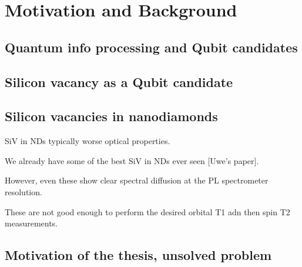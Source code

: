 
\chapter[Motivation and Background]
{Motivation and Background} %

\label{Chapter1} %


\newcommand{\keyword}[1]{\textbf{#1}}
\newcommand{\tabhead}[1]{\textbf{#1}}
\newcommand{\code}[1]{\texttt{#1}}
\newcommand{\file}[1]{\texttt{\bfseries#1}}
\newcommand{\option}[1]{\texttt{\itshape#1}}


\section[Quantum info processing and Qubit candidates]{Quantum info processing and Qubit candidates}



\section[Silicon vacancy as a Qubit candidate]{Silicon vacancy as a Qubit candidate}


\section[Silicon vacancies in nanodiamonds]{Silicon vacancies in nanodiamonds}

SiV in NDs typically worse optical properties.

We already have some of the best SiV in NDs ever seen [Uwe's paper].

However, even these show clear spectral diffusion at the PL spectrometer resolution.

These are not good enough to perform the desired orbital T1 adn then spin T2 measurements.


\section[Motivation of the thesis, unsolved problem]{Motivation of the thesis, unsolved problem}

